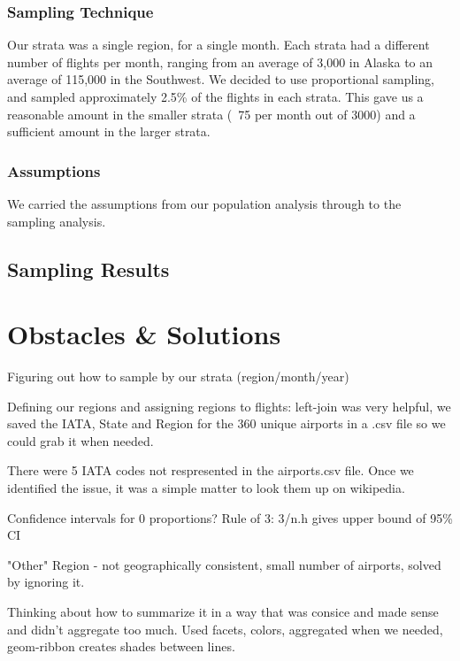 \documentclass{article}
\begin{document}
\subsubsection{Sampling Technique}
Our strata was a single region, for a single month. Each strata had a different number of flights per month, ranging from an average of 3,000 in Alaska to an average of 115,000 in the Southwest. We decided to use proportional sampling, and sampled approximately 2.5\% of the flights in each strata. This gave us a reasonable amount in the smaller strata (~75 per month out of 3000) and a sufficient amount in the larger strata. 

\subsubsection{Assumptions}
We carried the assumptions from our population analysis through to the sampling analysis.

\subsection{Sampling Results}





\section{Obstacles \& Solutions}
Figuring out how to sample by our strata (region/month/year)

Defining our regions and assigning regions to flights: left-join was very helpful, we saved the IATA, State and Region for the 360 unique airports in a .csv file so we could grab it when needed.

There were 5 IATA codes not respresented in the airports.csv file. Once we identified the issue, it was a simple matter to look them up on wikipedia. 

Confidence intervals for 0 proportions? Rule of 3: 3/n.h gives upper bound of 95\% CI

"Other" Region - not geographically consistent, small number of airports, solved by ignoring it.

Thinking about how to summarize it in a way that was consice and made sense and didn't aggregate too much. Used facets, colors, aggregated when we needed, geom-ribbon creates shades between lines.
\end{document}

